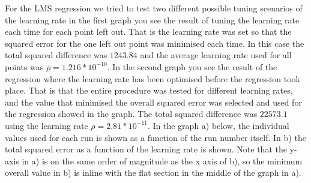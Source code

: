 \documentclass[12pt, a4paper]{article}
\begin{document}
For the LMS regression we tried to test two different possible tuning scenarios of the learning rate in the first graph you see the result of tuning the learning rate each time for each point left out. That is the learning rate was set so that the squared error for the one left out point was minimised each time. In this case the total squared difference was $1243.84$ and the average learning rate used for all points was $\bar{\rho} = 1.216*10^{-10}$. In the second graph you see the result of the regression where the learning rate has been optimised before the regression took place. That is that the entire procedure was tested for different learning rates, and the value that minimised the overall squared error was selected and used for the regression showed in the graph. The total squared difference was $22573.1$ using the learning rate $\rho = 2.81*10^{-11}$. In the graph a) below, the individual values used for each run is shown as a function of the run number itself. In b) the total squared error as a function of the learning rate is shown. Note that the y-axis in a) is on the same order of magnitude as the x axis of b), so the minimum overall value in b) is inline with the flat section in the middle of the graph in a).
\end{document}
